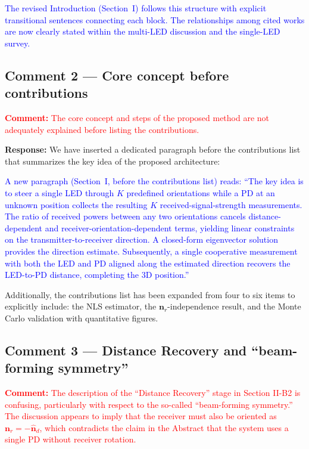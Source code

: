\documentclass[11pt]{article}
\newcommand{\reviewercomment}[1]{\noindent\textcolor{red}{\textbf{Comment:} #1}\par\vspace{6pt}}
\newcommand{\response}{\noindent\textbf{Response:} }
\newcommand{\change}[1]{\textcolor{blue}{#1}}
\begin{document}
\change{The revised Introduction (Section~I) follows this structure with explicit transitional sentences connecting each block. The relationships among cited works are now clearly stated within the multi-LED discussion and the single-LED survey.}

\subsection{Comment 2 --- Core concept before contributions}

\reviewercomment{The core concept and steps of the proposed method are not adequately explained before listing the contributions.}

\response We have inserted a dedicated paragraph before the contributions list that summarizes the key idea of the proposed architecture:

\change{A new paragraph (Section~I, before the contributions list) reads: ``The key idea is to steer a single LED through $K$ predefined orientations while a PD at an unknown position collects the resulting $K$ received-signal-strength measurements. The ratio of received powers between any two orientations cancels distance-dependent and receiver-orientation-dependent terms, yielding linear constraints on the transmitter-to-receiver direction. A closed-form eigenvector solution provides the direction estimate. Subsequently, a single cooperative measurement with both the LED and PD aligned along the estimated direction recovers the LED-to-PD distance, completing the 3D position.''}

Additionally, the contributions list has been expanded from four to six items to explicitly include: the NLS estimator, the $\mathbf{n}_r$-independence result, and the Monte Carlo validation with quantitative figures.

\subsection{Comment 3 --- Distance Recovery and ``beam-forming symmetry''}

\reviewercomment{The description of the ``Distance Recovery'' stage in Section II-B2 is confusing, particularly with respect to the so-called ``beam-forming symmetry.'' The discussion appears to imply that the receiver must also be oriented as $\mathbf{n}_r = -\hat{\mathbf{n}}_d$, which contradicts the claim in the Abstract that the system uses a single PD without receiver rotation.}
\end{document}
